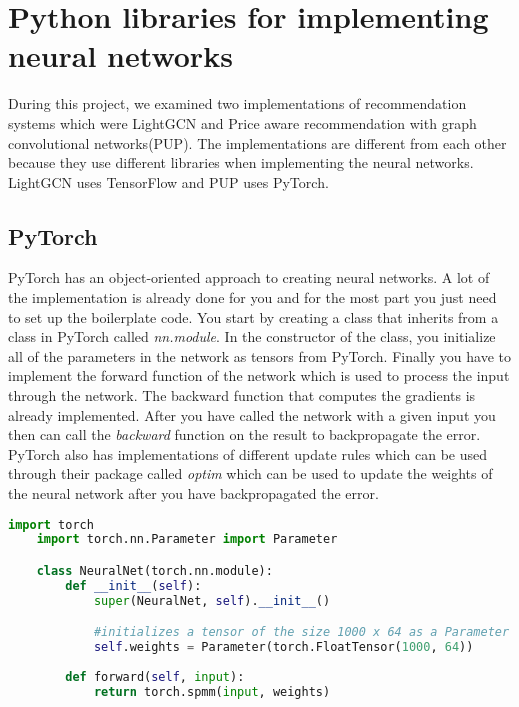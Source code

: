 \section{Python libraries for implementing neural networks}
During this project, we examined two implementations of recommendation systems which were LightGCN and Price aware recommendation with graph convolutional networks(PUP). 
The implementations are different from each other because they use different libraries when implementing the neural networks.
LightGCN uses TensorFlow and PUP uses PyTorch.

\subsection{PyTorch}
PyTorch has an object-oriented approach to creating neural networks.
A lot of the implementation is already done for you and for the most part you just need to set up the boilerplate code.
You start by creating a class that inherits from a class in PyTorch called \textit{nn.module}.
In the constructor of the class, you initialize all of the parameters in the network as tensors from PyTorch.
Finally you have to implement the forward function of the network which is used to process the input through the network.
The backward function that computes the gradients is already implemented.
After you have called the network with a given input you then can call the \textit{backward} function on the result to backpropagate the error.
PyTorch also has implementations of different update rules which can be used through their package called \textit{optim} which can be used to update the weights of the neural network after you have backpropagated the error.

\begin{lstlisting}[language=Python]
	import torch
	import torch.nn.Parameter import Parameter

	class NeuralNet(torch.nn.module):
		def __init__(self):
			super(NeuralNet, self).__init__()

			#initializes a tensor of the size 1000 x 64 as a Parameter in the neural network
			self.weights = Parameter(torch.FloatTensor(1000, 64))
		
		def forward(self, input):
			return torch.spmm(input, weights)

\end{lstlisting}

